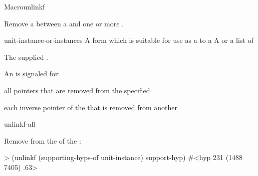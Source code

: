 \documentclass[10pt,twoside,english,pdftex]{article}
\begin{document}
\begin{functiondoc}{Macro}{unlinkf}%
  {
    \returns{} } 
%
%

\fnsyntax

\fnpurpose Remove a  between a  and one
or more .

\fnpackage {}

\fnmodule {}

\fnargs
\begin{args}{unit-instance-or-instances}
 A form which is suitable for use as a
 to a 
 A  or a
list of 
\end{args}

\fnreturns The supplied .

\fnevents
{}%
%
%
An  is signaled for:
\begin{tightitemize}
\item all pointers that are removed from the specified
\item each inverse pointer of the  that is removed from
  another 
\end{tightitemize}

\begin{alsos}{unlinkf-all}
\also[linkf]
\end{alsos}

\fnexample Remove  from the 
 of the  
:
\begin{example}
> (unlinkf (supporting-hyps-of unit-instance) support-hyp)
#<hyp 231 (1488 7405) .63>
\end{example}

\end{functiondoc}

\end{document}
